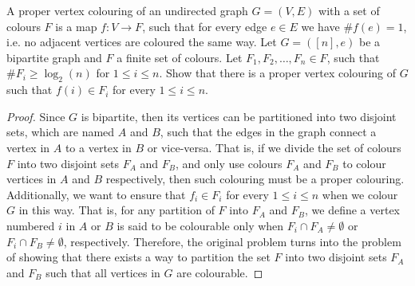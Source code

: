 \begin{problem}
  A proper vertex colouring of an undirected graph $G=(V,E)$ with a set of colours $F$ is a map $f: V \to F$, such that for every edge $e \in E$ we have $\# f(e)=1$, i.e. no adjacent vertices are coloured the same way. Let $G=([n],e)$ be a bipartite graph and $F$ a finite set of colours. Let $F_{1}, F_{2}, \ldots, F_{n} \in F$, such that $\# F_{i} \geq \log_{2}(n)$ for $1 \leq i \leq n$. Show that there is a proper vertex colouring of $G$ such that $f(i) \in F_{i}$ for every $1 \leq i \leq n$.
\end{problem}
\begin{proof}
  Since $G$ is bipartite, then its vertices can be partitioned into two disjoint sets, which are named $A$ and $B$, such that the edges in the graph connect a vertex in $A$ to a vertex in $B$ or vice-versa. That is, if we divide the set of colours $F$ into two disjoint sets $F_{A}$ and $F_{B}$, and only use colours $F_{A}$ and $F_{B}$ to colour vertices in $A$ and $B$ respectively, then such colouring must be a proper colouring. Additionally, we want to ensure that $f_{i} \in F_{i}$ for every $1 \leq i \leq n$ when we colour $G$ in this way. That is, for any partition of $F$ into $F_{A}$ and $F_{B}$, we define a vertex numbered $i$ in $A$ or $B$ is said to be colourable only when $F_{i} \cap F_{A} \neq \emptyset$ or $F_{i} \cap F_{B} \neq \emptyset$, respectively. Therefore, the original problem turns into the problem of showing that there exists a way to partition the set $F$ into two disjoint sets $F_{A}$ and $F_{B}$ such that all vertices in $G$ are colourable.


\end{proof}
